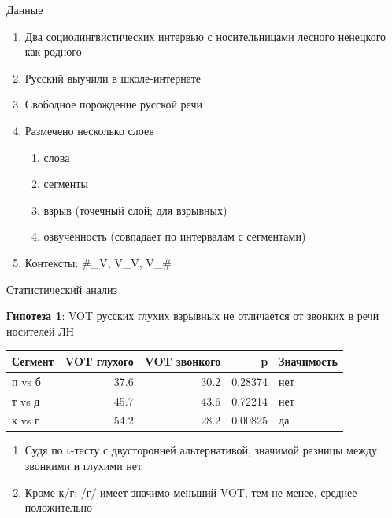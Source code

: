 \documentclass[10 pt, handout]{beamer}
\begin{document}
\begin{frame}{Данные}

	\begin{enumerate}[$\gg$]
		\item Два социолингвистических интервью с носительницами лесного ненецкого как родного
		\item Русский выучили в школе-интернате
		\item Свободное порождение русской речи
		\item Размечено несколько слоев
			\begin{enumerate}[$\cdot$]
				\item слова
				\item сегменты
				\item взрыв (точечный слой; для взрывных)
				\item озвученность (совпадает по интервалам с сегментами)
			\end{enumerate}
		\item Контексты: \#\_V, V\_V, V\_\#
	\end{enumerate}

\end{frame}

\begin{frame}{Статистический анализ}

	\textbf{Гипотеза 1}: VOT русских глухих взрывных не отличается от звонких в речи носителей ЛН
	\vfill
	
\begin{tabular}{lrrrl}
\toprule
\textbf{Сегмент} &  \textbf{VOT глухого} &  \textbf{VOT звонкого} &       \textbf{p} & \textbf{Значимость} \\
\midrule
 п vs б &      37.6 &      30.2 & 0.28374 &          нет \\
 т vs д &      45.7 &      43.6 & 0.72214 &          нет \\
 к vs г &      54.2 &      28.2 & 0.00825 &         да \\
\bottomrule
\end{tabular}

	\vfill
	\begin{enumerate}[$\gg$]
		\item Судя по t-тесту с двусторонней альтернативой, значимой разницы между звонкими и глухими нет
		\item Кроме к/г: /г/ имеет значимо меньший VOT, тем не менее, среднее положительно
	\end{enumerate}

\end{frame}
\end{document}
